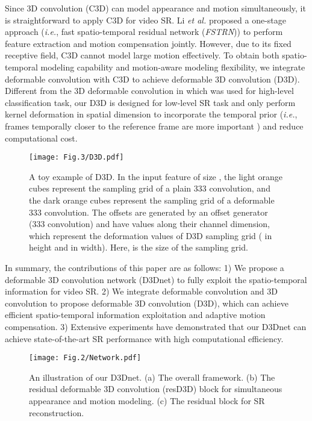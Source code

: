 \documentclass[journal]{IEEEtran}
\begin{document}
Since 3D convolution (C3D) \cite{C3D} can model appearance and motion simultaneously, it is straightforward to apply C3D for video SR. Li \textit{et al.} \cite{FSTRN} proposed a one-stage approach (\textit{i.e.}, fast spatio-temporal residual network (\textit{FSTRN})) to perform feature extraction and motion compensation jointly. However, due to its fixed receptive field, C3D cannot model large motion effectively. To obtain both spatio-temporal modeling capability and motion-aware modeling flexibility, we integrate deformable convolution \cite{DCN1} with C3D  to achieve deformable 3D convolution (D3D). Different from the 3D deformable convolution in \cite{MRI} which was used for high-level classification task, our D3D is designed for low-level SR task and only perform kernel deformation in spatial dimension to incorporate the temporal prior (\textit{i.e.}, frames temporally closer to the reference frame are more important \cite{EDVR,TGA-VSR}) and reduce computational cost.

\begin{figure*}[t]
\centering
\vspace{-.15in}
\texttt{[image: Fig.3/D3D.pdf]}
\caption{A toy example of D3D. In the input feature of size , the light orange cubes represent the sampling grid of a plain 333 convolution, and the dark orange cubes represent the sampling grid of a deformable 333 convolution. The offsets are generated by an offset generator (333 convolution) and have  values along their  channel dimension, which represent the deformation values of D3D sampling grid ( in height and  in width). Here,  is the size of the sampling grid.}\label{FigSD3D}
\end{figure*}

In summary, the contributions of this paper are as follows: 1) We propose a deformable 3D convolution network (D3Dnet) to fully exploit the spatio-temporal information for video SR. 2) We integrate deformable convolution \cite{DCN1} and 3D convolution \cite{C3D} to propose deformable 3D convolution (D3D), which can achieve efficient spatio-temporal information exploitation and adaptive motion compensation. 3) Extensive experiments have demonstrated that our D3Dnet can achieve state-of-the-art SR performance with high computational efficiency.


\begin{figure}[t]
\vspace{-.1in}
\centering\texttt{[image: Fig.2/Network.pdf]}
\caption{An illustration of our D3Dnet. (a) The overall framework. (b) The residual deformable 3D
convolution (resD3D) block for simultaneous appearance and motion modeling. (c) The residual block for SR reconstruction.}\label{FigNetwork}
\end{figure}
\end{document}
